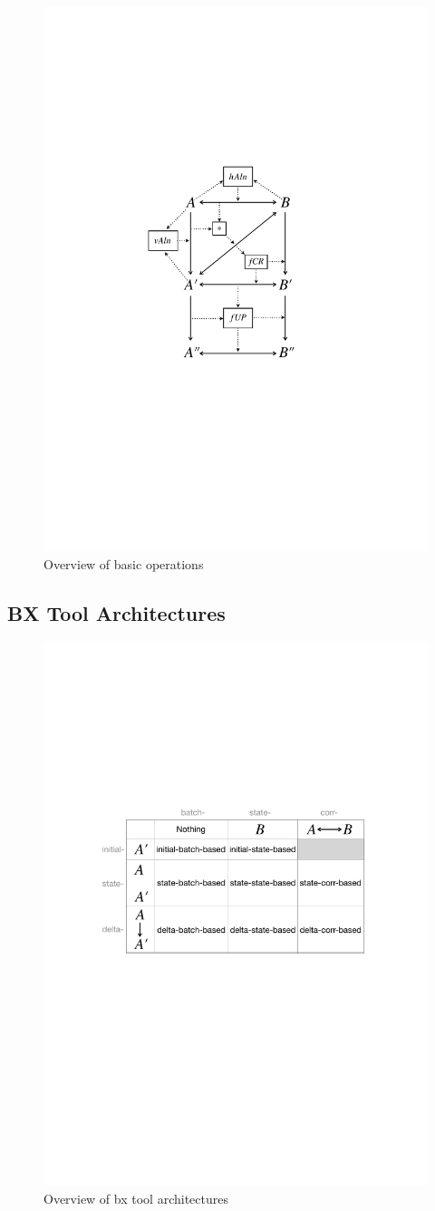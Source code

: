 \begin{figure}[tb!]
	\centering
	\includegraphics[width=0.55\columnwidth]{diagrams/foundations//BasicOperationsOverview}
	\caption{Overview of basic operations}
	\label{fig:basicOperationsOverview}
\end{figure}

\subsection{BX Tool Architectures}

\begin{figure}[tb!]
	\centering
	\includegraphics[width=0.9\columnwidth]{diagrams/foundations//ArchitectureLandscape}
	\caption{Overview of bx tool architectures}
	\label{fig:architectureLandscape}
\end{figure}

